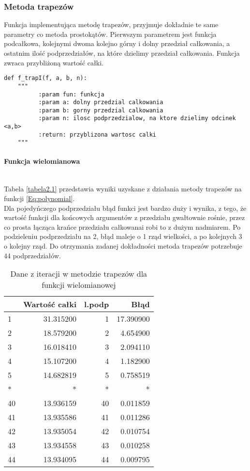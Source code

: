 \documentclass[12pt,twoside]{article}
\begin{document}
\subsubsection{Metoda trapezów}

Funkcja implementująca metodę trapezów, przyjmuje dokładnie te same parametry co metoda prostokątów. Pierwszym parametrem jest funkcja podcałkowa, kolejnymi dwoma kolejno górny i dolny przedział całkowania, a ostatnim  ilość podprzedziałów, na które dzielimy przedział całkowania. Funkcja zwraca przybliżoną wartość całki.

\begin{lstlisting}[caption={Kod w języku python implementujący metodę trapezów}]
def f_trapI(f, a, b, n):
    """
     	  :param fun: funkcja
          :param a: dolny przedzial calkowania
          :param b: gorny przedzial calkowania
          :param n: ilosc podprzedzialow, na ktore dzielimy odcinek <a,b>
          :return: przyblizona wartosc calki
    """
\end{lstlisting}
\label{Listing 7}

\paragraph{Funkcja wielomianowa}\mbox{} \\

Tabela \eqref{tabela2.1} przedstawia wyniki uzyskane z działania metody trapezów na funkcji \eqref{Eq:polynomial}.\\
Dla pojedyńczego podprzedziału błąd funkci jest bardzo duży i wynika, z tego, że wartość funkcji dla końcowych argumentów z przedziału gwałtownie rośnie, przez co prosta łącząca krańce przedziału całkowanai robi to z dużym nadmiarem. Po podzieleniu podprzedziału na 2, błąd maleje o 1 rząd wielkości, a po kolejnych 3 o kolejny rząd. Do otrzymania zadanej dokładności metoda trapezów potrzebuje 44 podprzedziałów.
\begin{table}[ht]
\centering 
\caption{Dane z iteracji w metodzie trapezów dla funkcji wielomianowej}
\label{tabela2.1}
\begin{tabular}{lrrr}
\toprule
{} &  Wartość całki &  l.podp &       Błąd \\
\midrule
1  &      31.315200 &       1 &  17.390900 \\
2  &      18.579200 &       2 &   4.654900 \\
3  &      16.018410 &       3 &   2.094110 \\
4  &      15.107200 &       4 &   1.182900 \\
5  &      14.682819 &       5 &   0.758519 \\
* &      * &      * &   * \\
40 &      13.936159 &      40 &   0.011859 \\
41 &      13.935586 &      41 &   0.011286 \\
42 &      13.935054 &      42 &   0.010754 \\
43 &      13.934558 &      43 &   0.010258 \\
44 &      13.934095 &      44 &   0.009795 \\
\bottomrule
\end{tabular}
\end{table}
\end{document}
